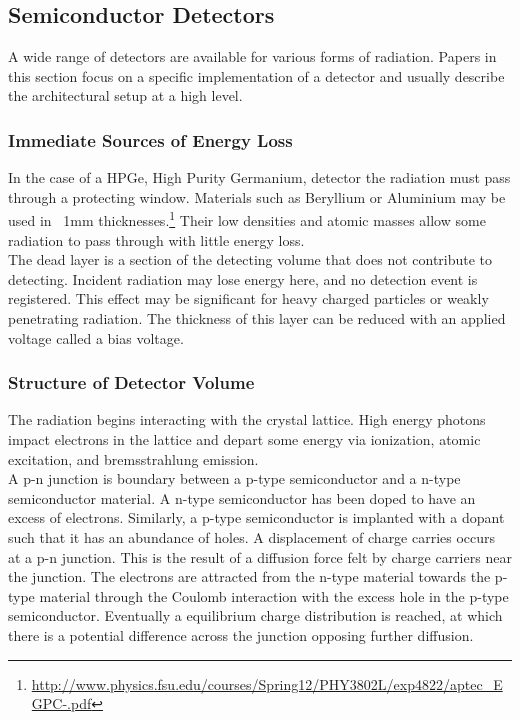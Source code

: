 \documentclass[12pt]{article}
\begin{document}
\begin{doublespacing}
\subsection{Semiconductor Detectors}   %
A wide range of detectors are available for various forms of radiation.
Papers in this section focus on a specific implementation of a detector and usually describe the architectural setup at a high level.

\subsubsection{Immediate Sources of Energy Loss}

In the case of a HPGe, High Purity Germanium, detector the radiation must pass through a protecting window. 
Materials such as Beryllium or Aluminium may be used in ~1mm thicknesses.\footnote{\url{http://www.physics.fsu.edu/courses/Spring12/PHY3802L/exp4822/aptec_EGPC-.pdf}} 
Their low densities and atomic masses allow some radiation to pass through with little energy loss.
\\

The dead layer is a section of the detecting volume that does not contribute to detecting. 
Incident radiation may lose energy here, and no detection event is registered. 
This effect may be significant for heavy charged particles or weakly penetrating radiation.
The thickness of this layer can be reduced with an applied voltage called a bias voltage.
\\


\subsubsection{Structure of Detector Volume}

The radiation begins interacting with the crystal lattice. 
High energy photons impact electrons in the lattice and depart some energy via ionization, atomic excitation, and bremsstrahlung emission. 
\\

A p-n junction is boundary between a p-type semiconductor and a n-type semiconductor material. 
A n-type semiconductor has been doped to have an excess of electrons. 
Similarly, a p-type semiconductor is implanted with a dopant such that it has an abundance of holes. 
A displacement of charge carries occurs at a p-n junction. 
This is the result of a diffusion force felt by charge carriers near the junction. 
The electrons are attracted from the n-type material towards the p-type material through the Coulomb interaction with the excess hole in the p-type semiconductor. 
Eventually a equilibrium charge distribution is reached, at which there is a potential difference across the junction opposing further diffusion.
\\



\end{doublespacing}
\end{document}

